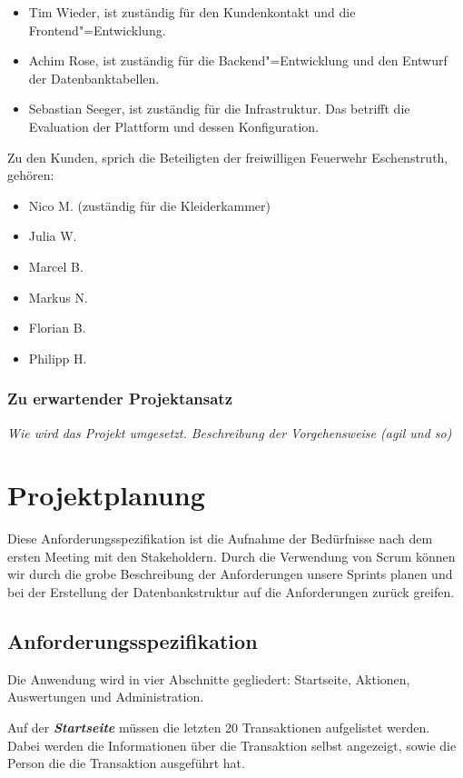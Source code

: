\begin{itemize}
\item Tim Wieder, ist zuständig für den Kundenkontakt und die Frontend"=Entwicklung.
\item Achim Rose, ist zuständig für die Backend"=Entwicklung und den Entwurf der Datenbanktabellen. 
\item Sebastian Seeger, ist zuständig für die Infrastruktur. Das betrifft die Evaluation der Plattform und dessen Konfiguration.
\end{itemize}

Zu den Kunden, sprich die Beteiligten der freiwilligen Feuerwehr Eschenstruth, gehören: 

\begin{itemize}
\item Nico M. (zuständig für die Kleiderkammer)
\item Julia W.
\item Marcel B.
\item Markus N.
\item Florian B.
\item Philipp H.
\end{itemize}

\subsubsection{Zu erwartender Projektansatz}

\textit{Wie wird das Projekt umgesetzt. Beschreibung der Vorgehensweise (agil und so)}

\section{Projektplanung}\label{sec:Projektplanung}

Diese Anforderungsspezifikation ist die Aufnahme der Bedürfnisse nach dem ersten Meeting mit den Stakeholdern. Durch die Verwendung von Scrum können wir durch die grobe Beschreibung der Anforderungen unsere Sprints planen und bei der Erstellung der Datenbankstruktur auf die Anforderungen zurück greifen. 


\subsection{Anforderungsspezifikation}

Die Anwendung wird in vier Abschnitte gegliedert: Startseite, Aktionen, Auswertungen und Administration.

Auf der \textit{\textbf{Startseite}} müssen die letzten 20 Transaktionen aufgelistet werden. Dabei werden die Informationen über die Transaktion selbst angezeigt, sowie die Person die die Transaktion ausgeführt hat.

